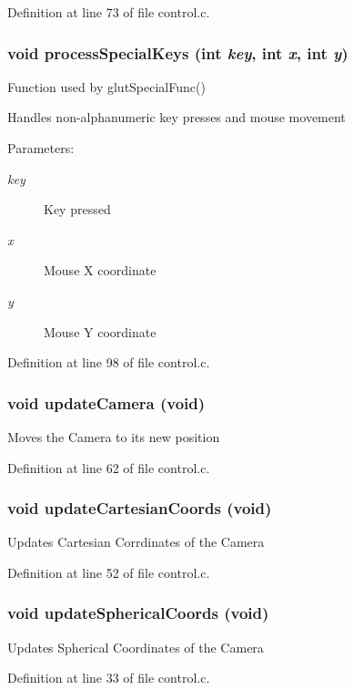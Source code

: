 Definition at line 73 of file control.c.
\subsubsection{\setlength{\rightskip}{0pt plus 5cm}void process\-Special\-Keys (int {\em key}, int {\em x}, int {\em y})}\label{control_8h_a4}


Function used by glut\-Special\-Func()

Handles non-alphanumeric key presses and mouse movement \begin{Desc}
\item[Parameters:]
\begin{description}
\item[{\em key}]Key pressed \item[{\em x}]Mouse X coordinate \item[{\em y}]Mouse Y coordinate \end{description}
\end{Desc}


Definition at line 98 of file control.c.
\subsubsection{\setlength{\rightskip}{0pt plus 5cm}void update\-Camera (void)}\label{control_8h_a2}


Moves the Camera to its new position 

Definition at line 62 of file control.c.
\subsubsection{\setlength{\rightskip}{0pt plus 5cm}void update\-Cartesian\-Coords (void)}\label{control_8h_a1}


Updates Cartesian Corrdinates of the Camera 

Definition at line 52 of file control.c.
\subsubsection{\setlength{\rightskip}{0pt plus 5cm}void update\-Spherical\-Coords (void)}\label{control_8h_a0}


Updates Spherical Coordinates of the Camera 

Definition at line 33 of file control.c.